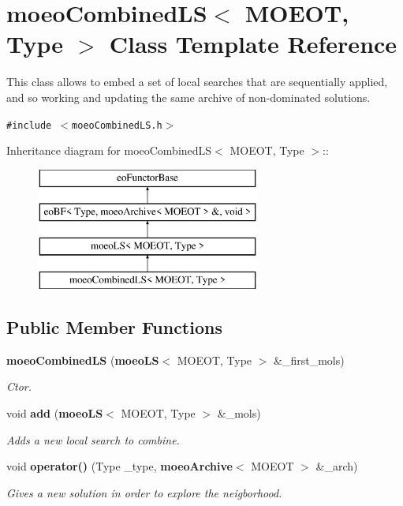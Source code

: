 \section{moeo\-Combined\-LS$<$ MOEOT, Type $>$ Class Template Reference}
\label{classmoeoCombinedLS}
This class allows to embed a set of local searches that are sequentially applied, and so working and updating the same archive of non-dominated solutions.  


{\tt \#include $<$moeo\-Combined\-LS.h$>$}

Inheritance diagram for moeo\-Combined\-LS$<$ MOEOT, Type $>$::\begin{figure}[H]
\begin{center}
\leavevmode
\includegraphics[height=4cm]{classmoeoCombinedLS}
\end{center}
\end{figure}
\subsection*{Public Member Functions}
\begin{CompactItemize}
\item 
{\bf moeo\-Combined\-LS} ({\bf moeo\-LS}$<$ MOEOT, Type $>$ \&\_\-first\_\-mols)
\begin{CompactList}\small\item\em Ctor. \item\end{CompactList}\item 
void {\bf add} ({\bf moeo\-LS}$<$ MOEOT, Type $>$ \&\_\-mols)
\begin{CompactList}\small\item\em Adds a new local search to combine. \item\end{CompactList}\item 
void {\bf operator()} (Type \_\-type, {\bf moeo\-Archive}$<$ MOEOT $>$ \&\_\-arch)
\begin{CompactList}\small\item\em Gives a new solution in order to explore the neigborhood. \item\end{CompactList}\end{CompactItemize}

